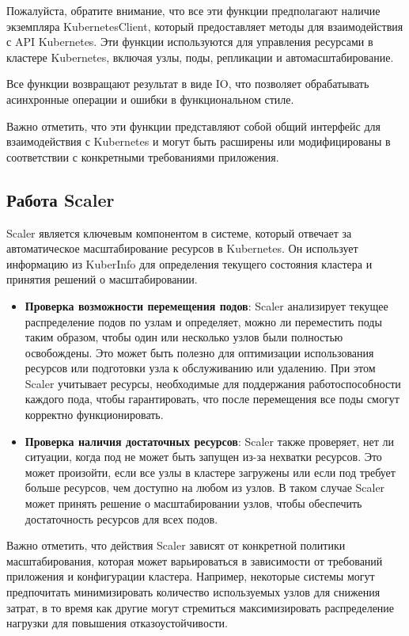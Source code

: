 Пожалуйста, обратите внимание, что все эти функции предполагают наличие
экземпляра KubernetesClient, который предоставляет методы для взаимодействия с
API Kubernetes. Эти функции используются для управления ресурсами в кластере
Kubernetes, включая узлы, поды, репликации и автомасштабирование.

Все функции возвращают результат в виде IO, что позволяет обрабатывать
асинхронные операции и ошибки в функциональном стиле.

Важно отметить, что эти функции представляют собой общий интерфейс для
взаимодействия с Kubernetes и могут быть расширены или модифицированы в
соответствии с конкретными требованиями приложения.

\subsection{Работа Scaler}

Scaler является ключевым компонентом в системе, который отвечает за
автоматическое масштабирование ресурсов в Kubernetes. Он использует информацию
из KuberInfo для определения текущего состояния кластера и принятия решений о
масштабировании.

\begin{itemize}
\item \textbf{Проверка возможности перемещения подов}: Scaler анализирует
текущее распределение подов по узлам и определяет, можно ли переместить поды
таким образом, чтобы один или несколько узлов были полностью освобождены. Это
может быть полезно для оптимизации использования ресурсов или подготовки узла к
обслуживанию или удалению. При этом Scaler учитывает ресурсы, необходимые для
поддержания работоспособности каждого пода, чтобы гарантировать, что после
перемещения все поды смогут корректно функционировать.

\item \textbf{Проверка наличия достаточных ресурсов}: Scaler также проверяет,
нет ли ситуации, когда под не может быть запущен из-за нехватки ресурсов. Это
может произойти, если все узлы в кластере загружены или если под требует больше
ресурсов, чем доступно на любом из узлов. В таком случае Scaler может принять
решение о масштабировании узлов, чтобы обеспечить достаточность ресурсов для
всех подов.
\end{itemize}

Важно отметить, что действия Scaler зависят от конкретной политики
масштабирования, которая может варьироваться в зависимости от требований
приложения и конфигурации кластера. Например, некоторые системы могут
предпочитать минимизировать количество используемых узлов для снижения затрат, в
то время как другие могут стремиться максимизировать распределение нагрузки для
повышения отказоустойчивости.

